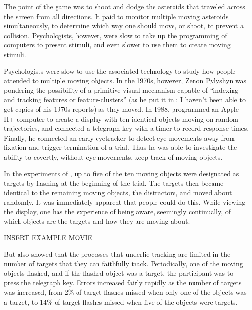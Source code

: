\documentclass[
]{book}
\begin{document}
The point of the game was to shoot and dodge the asteroids that traveled across the screen from all directions. It paid to monitor multiple moving asteroids simultaneously, to determine which way one should move, or shoot, to prevent a collision. Psychologists, however, were slow to take up the programming of computers to present stimuli, and even slower to use them to create moving stimuli.

Psychologists were slow to use the associated technology to study how people attended to multiple moving objects. In the 1970s, however, Zenon Pylyshyn was pondering the possibility of a primitive visual mechanism capable of ``indexing and tracking features or feature-clusters'' (as he put it in \citet{pylyshynTrackingMultipleIndependent1988}; I haven't been able to get copies of his 1970s reports) as they moved. In 1988, \citet{pylyshynTrackingMultipleIndependent1988} programmed an Apple II+ computer to create a display with ten identical objects moving on random trajectories, and connected a telegraph key with a timer to record response times. Finally, he connected an early eyetracker to detect eye movements away from fixation and trigger termination of a trial. Thus he was able to investigate the ability to covertly, without eye movements, keep track of moving objects.

In the experiments of \citet{pylyshynTrackingMultipleIndependent1988}, up to five of the ten moving objects were designated as targets by flashing at the beginning of the trial. The targets then became identical to the remaining moving objects, the distractors, and moved about randomly. It was immediately apparent that people could do this. While viewing the display, one has the experience of being aware, seemingly continually, of which objects are the targets and how they are moving about.

INSERT EXAMPLE MOVIE

But \citet{pylyshynTrackingMultipleIndependent1988} also showed that the processes that underlie tracking are limited in the number of targets that they can faithfully track. Periodically, one of the moving objects flashed, and if the flashed object was a target, the participant was to press the telegraph key. Errors increased fairly rapidly as the number of targets was increased, from 2\% of target flashes missed when only one of the objects was a target, to 14\% of target flashes missed when five of the objects were targets.
\end{document}
